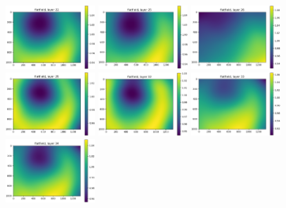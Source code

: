 \documentclass[letterpaper,11pt]{article}
\begin{document}
\begin{figure}[!ht]
\includegraphics[width=0.3\textwidth]{images/results/flatfield_layers/flatfield_layer_22}
\includegraphics[width=0.3\textwidth]{images/results/flatfield_layers/flatfield_layer_25}
\includegraphics[width=0.3\textwidth]{images/results/flatfield_layers/flatfield_layer_26}
\includegraphics[width=0.3\textwidth]{images/results/flatfield_layers/flatfield_layer_29}
\includegraphics[width=0.3\textwidth]{images/results/flatfield_layers/flatfield_layer_32}
\includegraphics[width=0.3\textwidth]{images/results/flatfield_layers/flatfield_layer_33}
\includegraphics[width=0.3\textwidth]{images/results/flatfield_layers/flatfield_layer_34}

\end{figure}
\end{document}
